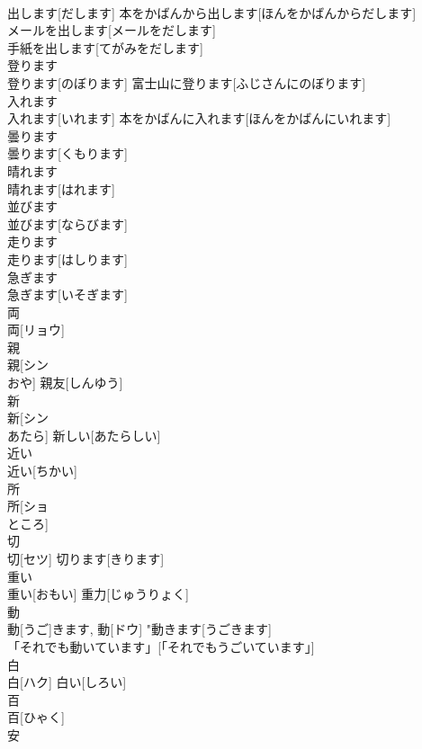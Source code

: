 \documentclass[8pt]{extreport}
\begin{document}
\begin{CJK}{UTF8}{min}
\\	出します[だします]	本をかばんから出します[ほんをかばんからだします] 
\\	メールを出します[メールをだします] 
\\	手紙を出します[てがみをだします] 
\\	登ります	
\\	登ります[のぼります]	富士山に登ります[ふじさんにのぼります] 
\\	入れます	
\\	入れます[いれます]	本をかばんに入れます[ほんをかばんにいれます] 
\\	曇ります	
\\	曇ります[くもります]	
\\	晴れます	
\\	晴れます[はれます]	
\\	並びます	
\\	並びます[ならびます]	
\\	走ります	
\\	走ります[はしります]	
\\	急ぎます	
\\	急ぎます[いそぎます]	
\\	両	
\\	両[リョウ]	
\\	親	
\\	親[シン 
\\	おや]	親友[しんゆう] 
\\	新	
\\	新[シン 
\\	あたら]	新しい[あたらしい] 
\\	近い	
\\	近い[ちかい]	
\\	所	
\\	所[ショ 
\\	ところ]	
\\	切	
\\	切[セツ]	切ります[きります] 
\\	重い	
\\	重い[おもい]	重力[じゅうりょく] 
\\	動	
\\	動[うご]きます, 動[ドウ]	"動きます[うごきます] 
\\	「それでも動いています」[「それでもうごいています」] 
\\	白	
\\	白[ハク]	白い[しろい] 
\\	百	
\\	百[ひゃく]	
\\	安	

\end{CJK}
\end{document}
